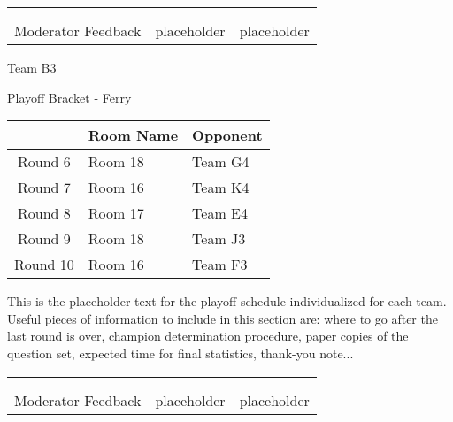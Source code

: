 \documentclass{article}%
\begin{document}
\newline%
%
\begin{tabularx}{\textwidth}{YYY}%
  &  &  \\%
\\%
Moderator Feedback&placeholder&placeholder\\%
\end{tabularx}%
\newpage%
\begin{center}%
\begin{Huge}%
Team B3%
\end{Huge}%
\vspace*{12pt}%
\linebreak%
\begin{Large}%
Playoff Bracket {-} Ferry%
\end{Large}%
\end{center}%
\vspace*{4pt}%
%
\begin{tabularx}{\textwidth}{|c|Y|Y|}%
\hline%
&Room Name&Opponent\\%
\hline%
Round 6&Room 18&Team G4\\%
Round 7&Room 16&Team K4\\%
Round 8&Room 17&Team E4\\%
Round 9&Room 18&Team J3\\%
Round 10&Room 16&Team F3\\%
\hline%
\end{tabularx}%
\vspace*{30pt}%
\linebreak%
This is the placeholder text for the playoff schedule individualized for each team. Useful pieces of information to include in this section are: where to go after the last round is over, champion determination procedure, paper copies of the question set, expected time for final statistics, thank{-}you note...%
\vspace*{30pt}%
\newline%
%
\begin{tabularx}{\textwidth}{YYY}%
  &  &  \\%
\\%
Moderator Feedback&placeholder&placeholder\\%
\end{tabularx}%
\end{document}
